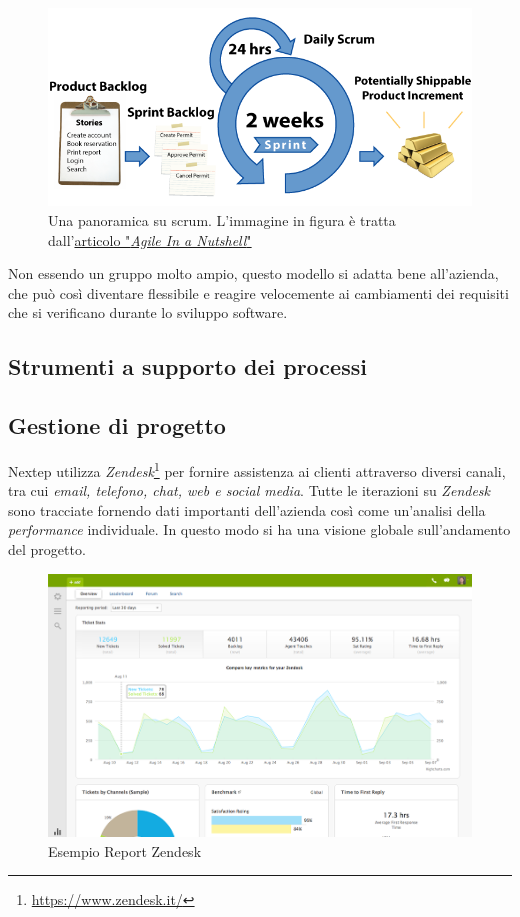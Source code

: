 \begin{figure}[h]
\centering
\includegraphics[width=0.8\linewidth]{immagini/scrum}
\caption[Una panoramica su scrum]{Una panoramica su scrum. L'immagine in figura è tratta dall'\href{http://www.agilenutshell.com/scrum}{articolo "\textit{Agile In a Nutshell}"}}
\label{fig:scrum}
\end{figure}


Non essendo un gruppo molto ampio, questo modello si adatta bene all'azienda, che può così diventare flessibile e reagire velocemente ai cambiamenti dei requisiti che si verificano durante lo sviluppo software.

\subsection{Strumenti a supporto dei processi}
\subsection*{Gestione di progetto}
Nextep utilizza \textit{Zendesk}\footnote{\url{https://www.zendesk.it/}} per fornire assistenza ai clienti attraverso diversi canali, tra cui \textit{email, telefono, chat, web e social media}. Tutte le iterazioni su \textit{Zendesk} sono tracciate fornendo dati importanti dell'azienda così come un'analisi della \textit{performance} individuale. In questo modo si ha una visione globale sull'andamento del progetto.
\begin{figure}[h]
\centering
\includegraphics[width=1.1\linewidth]{immagini/reporting}
\caption[Esempio Report Zendesk]{Esempio Report Zendesk}
\label{fig:reporting}
\end{figure}

